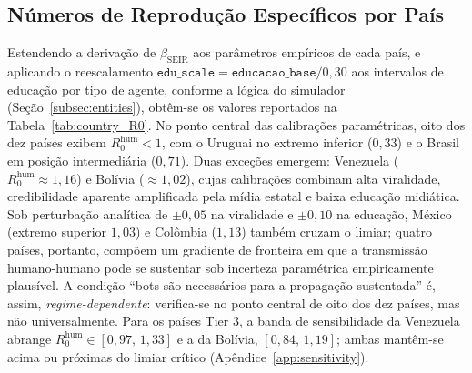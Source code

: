 \documentclass[12pt,a4paper]{article}
\theoremstyle{definition}
\theoremstyle{plain}
\begin{document}
\subsection{Números de Reprodução Específicos por País}
\label{subsec:R0_countries}

Estendendo a derivação de $\beta_{\text{SEIR}}$ aos parâmetros empíricos de cada país, e aplicando o reescalamento $\texttt{edu\_scale} = \texttt{educacao\_base}/0{,}30$ aos intervalos de educação por tipo de agente, conforme a lógica do simulador (Seção~\ref{subsec:entities}), obtêm-se os valores reportados na Tabela~\ref{tab:country_R0}. No ponto central das calibrações paramétricas, oito dos dez países exibem $R_0^{\text{hum}} < 1$, com o Uruguai no extremo inferior ($0{,}33$) e o Brasil em posição intermediária ($0{,}71$). Duas exceções emergem: Venezuela ($R_0^{\text{hum}} \approx 1{,}16$) e Bolívia ($\approx 1{,}02$), cujas calibrações combinam alta viralidade, credibilidade aparente amplificada pela mídia estatal e baixa educação midiática. Sob perturbação analítica de $\pm 0{,}05$ na viralidade e $\pm 0{,}10$ na educação, México (extremo superior $1{,}03$) e Colômbia ($1{,}13$) também cruzam o limiar; quatro países, portanto, compõem um gradiente de fronteira em que a transmissão humano-humano pode se sustentar sob incerteza paramétrica empiricamente plausível. A condição ``bots são necessários para a propagação sustentada'' é, assim, \emph{regime-dependente}: verifica-se no ponto central de oito dos dez países, mas não universalmente. Para os países Tier 3, a banda de sensibilidade da Venezuela abrange $R_0^{\text{hum}} \in [0{,}97,\,1{,}33]$ e a da Bolívia, $[0{,}84,\,1{,}19]$; ambas mantêm-se acima ou próximas do limiar crítico (Apêndice~\ref{app:sensitivity}).
\end{document}
